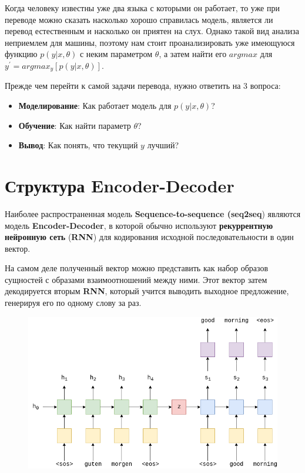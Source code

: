 \documentclass[a4paper,14pt]{article}
\begin{document}
	Когда человеку известны уже два языка с которыми он работает, то уже при переводе можно сказать насколько хорошо справилась модель, является ли перевод естественным и насколько он приятен на слух. Однако такой вид анализа неприемлем для машины, поэтому нам стоит проанализировать уже имеющуюся функцию $p(y|x,\theta)$ с неким параметром $\theta$, а затем найти его $argmax$ для $y^{'} = argmax_{y}[p(y|x, \theta)]$.
	
	Прежде чем перейти к самой задачи перевода, нужно ответить на 3 вопроса:
	
	\begin{itemize}
		\item \textbf{Моделирование}: Как работает модель для $p(y|x, \theta)$?
		\item \textbf{Обучение}: Как найти параметр $\theta$?
		\item \textbf{Вывод}: Как понять, что текущий $y$ лучший?
	\end{itemize}
	
	\clearpage
	
	\section{Структура Encoder-Decoder}
	
	Наиболее распространенная модель \textbf{Sequence-to-sequence (seq2seq}) являются модель \textbf{Encoder-Decoder}, в которой обычно используют \textbf{рекуррентную нейронную сеть} (\textbf{RNN}) для кодирования исходной последовательности в один вектор.
	
	На самом деле полученный вектор можно представить как набор образов сущностей с образами взаимоотношений между ними. Этот вектор затем декодируется вторым \textbf{RNN}, который учится выводить выходное предложение, генерируя его по одному слову за раз.
	
	\begin{figure}[htbp]
		\includegraphics[width=\linewidth]{img/encoder-decoder-img-1.png}
	\end{figure}
\end{document}
